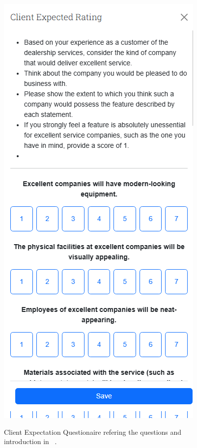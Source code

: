\begin{figure}[htbp]
  \caption{Client Expectation Questionaire refering the questions and introduction in ~\cite{master_servqual_model}.}
  \centering
  \includegraphics[width=\textwidth]{figs/Implementation/client/ExpectationQuestionare}
  \label{fig:ExpectationQuestionare}
\end{figure}


